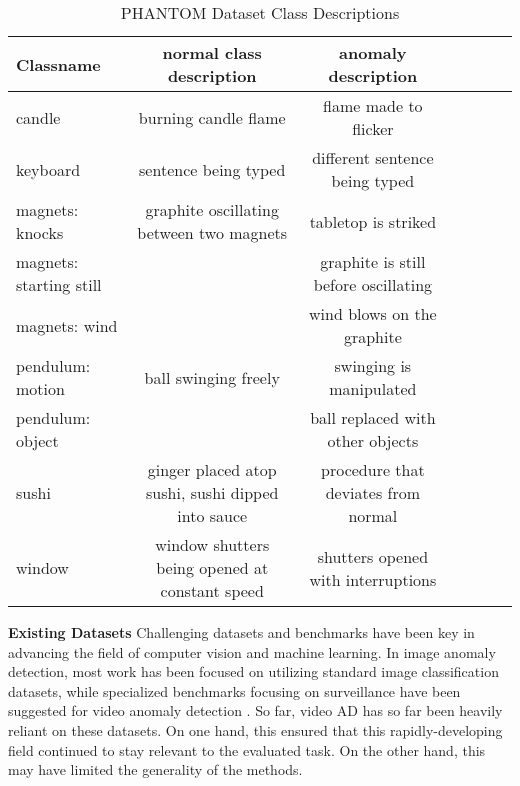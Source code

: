 \documentclass{article}
\begin{document}
\begin{table*}[ht!]
  \centering
  \label{tab:phantom_desc}

    \begin{tabular}{lcccccc}
    \toprule      

Classname	&	normal class description 	&	anomaly description		\\
\midrule						
candle	&	burning candle flame	&	flame made to flicker		\\
keyboard	&	sentence being typed	&	different sentence being typed		\\
magnets: knocks	&	graphite oscillating 
between two magnets	&	tabletop is striked		\\
magnets: starting still	&		&	graphite is still before 
oscillating		\\
magnets: wind	&		&	wind blows on the graphite		\\
pendulum: motion	&	ball swinging freely	&	swinging is manipulated		\\
pendulum: object	&		&	ball replaced with other objects		\\
sushi	&	ginger placed atop sushi,
 sushi dipped into sauce	&	 procedure that 
deviates from normal		\\
window	&	window shutters being 
opened at constant speed	&	shutters opened with interruptions		\\
	 \bottomrule
    \end{tabular}
    \caption{PHANTOM Dataset Class Descriptions}
\end{table*}

\textbf{Existing Datasets}
Challenging datasets and benchmarks have been key in advancing the field of computer vision and machine learning. In image anomaly detection, most work has been focused on utilizing standard image classification datasets, while specialized benchmarks focusing on surveillance have been suggested for video anomaly detection \cite{sultani2018real, pranav2020day, rodrigues2020multi, wu2020not}. So far, video AD has so far been heavily reliant on these datasets. On one hand, this ensured that this rapidly-developing field continued to stay relevant to the evaluated task. On the other hand, this may have limited the generality of the methods.
\end{document}
